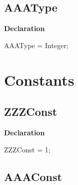 \documentclass{report}
\newif\ifpdf
\begin{document}
\subsection*{AAAType}
\fi
\label{ok_sorting-AAAType}
\begin{list}{}{
\setlength{\itemindent}{0cm}
\setlength{\listparindent}{0cm}
\setlength{\leftmargin}{\evensidemargin}
\addtolength{\leftmargin}{\tmplength}
\settowidth{\labelsep}{X}
\addtolength{\leftmargin}{\labelsep}
\setlength{\labelwidth}{\tmplength}
}
\item[\textbf{Declaration}\hfill]
\ifpdf
\begin{flushleft}
\fi
\begin{ttfamily}
AAAType = Integer;\end{ttfamily}

\ifpdf
\end{flushleft}
\fi

\end{list}
\section{Constants}
\ifpdf
\subsection*{\large{\textbf{ZZZConst}}\normalsize\hspace{1ex}\hrulefill}
\else
\subsection*{ZZZConst}
\fi
\label{ok_sorting-ZZZConst}
\begin{list}{}{
\setlength{\itemindent}{0cm}
\setlength{\listparindent}{0cm}
\setlength{\leftmargin}{\evensidemargin}
\addtolength{\leftmargin}{\tmplength}
\settowidth{\labelsep}{X}
\addtolength{\leftmargin}{\labelsep}
\setlength{\labelwidth}{\tmplength}
}
\item[\textbf{Declaration}\hfill]
\ifpdf
\begin{flushleft}
\fi
\begin{ttfamily}
ZZZConst = 1;\end{ttfamily}

\ifpdf
\end{flushleft}
\fi

\end{list}
\ifpdf
\subsection*{\large{\textbf{AAAConst}}\normalsize\hspace{1ex}\hrulefill}
\else
\end{document}

